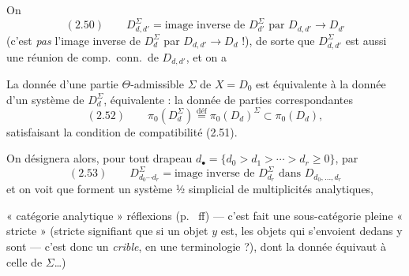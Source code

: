 \documentclass[11pt,a4paper]{article}
\begin{document}

   \struck{\ill{}} 

On  
\[
(2.50)\qquad D_{d,d'}^\Sigma=\text{image inverse de }D_{d'}^\Sigma\text{ par }D_{d,d'}\to D_{d'}
\]
(c'est \emph{pas} l'image inverse de $D_d^\Sigma$ par $D_{d,d'}\to D_d$ !), de sorte que $D_{d,d'}^\Sigma$ est aussi une réunion de comp.\ conn.\ de $D_{d,d'}$, et on a



La donnée d'une partie $\Theta$-admissible $\Sigma$ de $X=D_0$ est équivalente à la donnée d'un système de $D_d^\Sigma$, équivalente : la donnée de parties correspondantes
\[
(2.52)\qquad \pi_0(D_d^\Sigma)\overset{\text{déf}}{=}\pi_0(D_d)^\Sigma\subset\pi_0(D_d),
\]
satisfaisant la condition de compatibilité (2.51).

On désignera alors, pour tout drapeau $d_\bullet=\{d_0>d_1>\cdots>d_r\geq0\}$, par
\[
(2.53)\qquad D_{d_0\cdots d_r}^\Sigma=\text{image inverse de }D_{d_r}^\Sigma\text{ dans }D_{d_0,\dots,d_r}
\]
et on voit que  forment un système ½ simplicial de multiplicités analytiques,  

« catégorie analytique »   réflexions (p.~ ff) — c'est  fait une sous-catégorie pleine « stricte » (stricte signifiant que si un objet $y$ est, les objets qui s'envoient dedans y sont — c'est donc un \emph{crible}, en une terminologie  ?), dont la donnée équivaut à celle de \struck{\ill{}} $\Sigma$\ldots)
\end{document}
